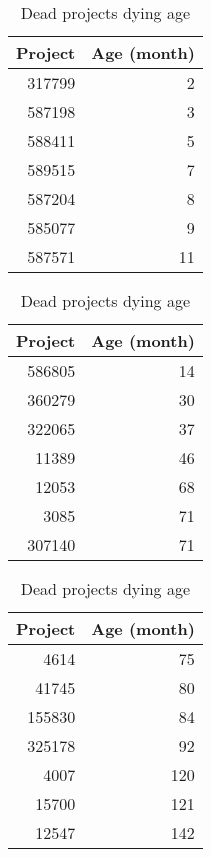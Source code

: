 \newcommand{\tableHeadDeads}{\bfseries{Project}\rm & \bfseries{Age (month)}\rm}
\begin{table}[ht]
\caption{Dead projects dying age}\label{table:deads}
\centering
\begin{tabular}{rr}
  \hline
  \tableHeadDeads \\ 
  \hline
317799 &   2 \\ 
  587198 &   3 \\ 
  588411 &   5 \\ 
  589515 &   7 \\ 
  587204 &   8 \\ 
  585077 &   9 \\ 
  587571 &  11 \\
  \hline
\end{tabular}
\hspace{1em}
\begin{tabular}{rr}
  \hline
  \tableHeadDeads \\
  \hline 
  586805 &  14 \\ 
  360279 &  30 \\ 
  322065 &  37 \\ 
  11389 &  46 \\ 
  12053 &  68 \\ 
  3085 &  71 \\ 
  307140 &  71 \\ 
  \hline
\end{tabular}
\hspace{1em}
\begin{tabular}{rr}
  \hline
  \tableHeadDeads \\ 
  \hline
  4614 &  75 \\ 
  41745 &  80 \\ 
  155830 &  84 \\ 
  325178 &  92 \\ 
  4007 & 120 \\ 
  15700 & 121 \\ 
  12547 & 142 \\ 
   \hline
\end{tabular}
\end{table}
